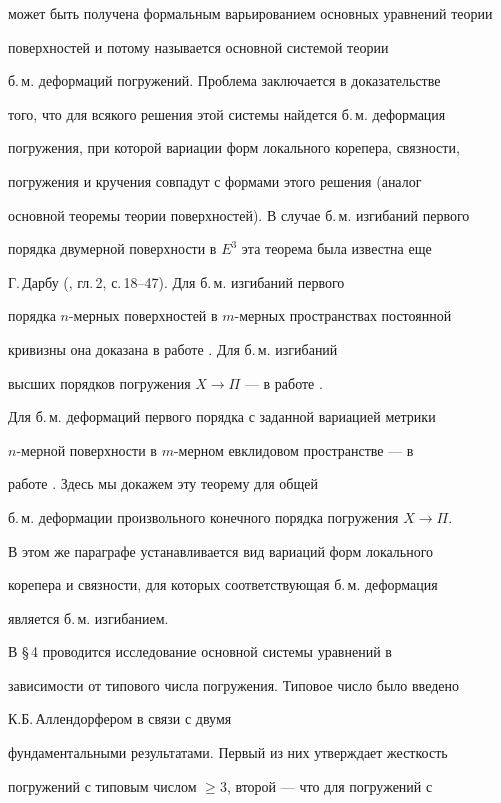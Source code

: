 может быть получена формальным варьированием основных уравнений теории


поверхностей и потому называется основной системой теории


б.\,м. деформаций погружений. Проблема заключается в доказательстве


того, что для всякого решения этой системы найдется б.\,м. деформация


погружения, при которой вариации форм локального корепера, связности,


погружения и кручения совпадут с формами этого решения (аналог


основной теоремы теории поверхностей). В случае б.\,м. изгибаний первого


порядка двумерной поверхности в $E^3$ эта теорема была известна еще


Г.\,Дарбу (\cite{Dar}, гл.\,2, с.\,18--47). Для б.\,м. изгибаний первого


порядка $n$-мерных поверхностей в $m$-мерных пространствах постоянной


кривизны она доказана в работе \cite{Mark3}. Для б.\,м. изгибаний


высших порядков погружения $X\to\Pi$ --- в работе \cite{Mark2}.


Для б.\,м. деформаций первого порядка с заданной вариацией метрики


$n$-мерной поверхности в $m$-мерном евклидовом пространстве --- в


работе \cite{Mark4}. Здесь мы докажем эту теорему для общей


б.\,м. деформации произвольного конечного порядка погружения $X\to\Pi$.


В этом же параграфе устанавливается вид вариаций форм локального


корепера и связности, для которых соответствующая б.\,м. деформация


является б.\,м. изгибанием.





В \S\,4 проводится исследование основной системы уравнений в


зависимости от типового числа погружения. Типовое число было введено


К.Б.\,Аллендорфером \cite{All} в связи с двумя


фундаментальными результатами. Первый из них утверждает жесткость


погружений с типовым числом $\ge3$, второй --- что для погружений с



